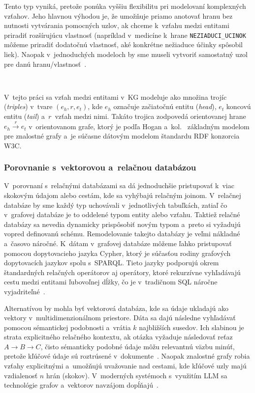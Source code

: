 Tento typ vyniká, pretože ponúka vyššiu flexibilitu pri modelovaní komplexných vzťahov. Jeho hlavnou výhodou je, že umožňuje priamo anotovať hranu bez nutnosti vytvárania pomocných uzlov, ak chceme k~vzťahu medzi entitami priradiť rozšírujúcu vlastnosť (napríklad v~medicíne k~hrane \texttt{NEZIADUCI\_UCINOK} môžeme priradiť dodatočnú vlastnosť, aké konkrétne nežiaduce účinky spôsobil liek). Naopak v~jednoduchých modeloch by sme museli vytvoriť samostatný uzol pre danú hranu/vlastnosť~\cite{hogan2021kg}.

\

V~tejto práci sa vzťah medzi entitami v~KG modeluje ako množina trojíc (\emph{triples}) v~tvare $(e_h, r, e_t)$, kde $e_h$ označuje začiatočnú entitu (\emph{head}), $e_t$ koncovú entitu (\emph{tail}) a~$r$~vzťah medzi nimi. Takáto trojica zodpovedá orientovanej hrane $e_h \xrightarrow{r} e_t$ v~orientovanom grafe, ktorý je podľa Hogan a~kol.~\cite{hogan2021kg} základným modelom pre znalostné grafy a~je súčasne dátovým modelom štandardu RDF konzorcia W3C.


\subsubsection{Porovnanie s~vektorovou a~relačnou databázou}

V~porovnaní s~relačnými databázami sa dá jednoduchšie pristupovať k~viac skokovým údajom alebo cestám, kde sa vyhýbajú relačným joinom. V~relačnej databáze by sme každý typ uchovávali v~jednotlivých tabuľkách, zatiaľ čo v~grafovej databáze je to oddelené typom entity alebo vzťahu. Taktiež relačné databázy sa nevedia dynamicky prispôsobiť novým typom a~preto si vyžadujú vopred definovanú schému. Remodelovanie takejto databázy je veľmi nákladné a~časovo náročné. K~dátam v~grafovej databáze môžeme ľahko pristupovať pomocou dopytovacieho jazyka Cypher, ktorý je súčasťou rodiny grafových dopytovacích jazykov spolu s~SPARQL. Tieto jazyky podporujú okrem štandardných relačných operátorov aj operátory, ktoré rekurzívne vyhľadávajú cestu medzi entitami ľubovoľnej dĺžky, čo je v~tradičnom SQL náročne vyjadriteľné~\cite{hogan2021kg}.

Alternatívou by mohla byť vektorová databáza, kde sa údaje ukladajú ako vektory v~multidimenzionálnom priestore. Dáta sa dajú následne vyhľadávať pomocou sémantickej podobnosti a~vrátia $k$ najbližších susedov. Ich slabinou je strata explicitného relačného kontextu, ak otázka vyžaduje následovať reťaz $A \to B \to C$, čisto sémanticky podobné údaje môžu relevantnú väzbu minúť, pretože kľúčové údaje sú roztrúsené v~dokumente~\cite{mlmastery2026vecvsgraph}. Naopak znalostné grafy robia vzťahy explicitnými a~umožňujú uvažovanie nad cestami, kde kľúčové uzly majú vzdialenosť $n$ hrán (skokov). V~moderných systémoch s~využitím LLM sa technológie grafov a~vektorov navzájom dopĺňajú~\cite{llmEmpKGcons2025}.


